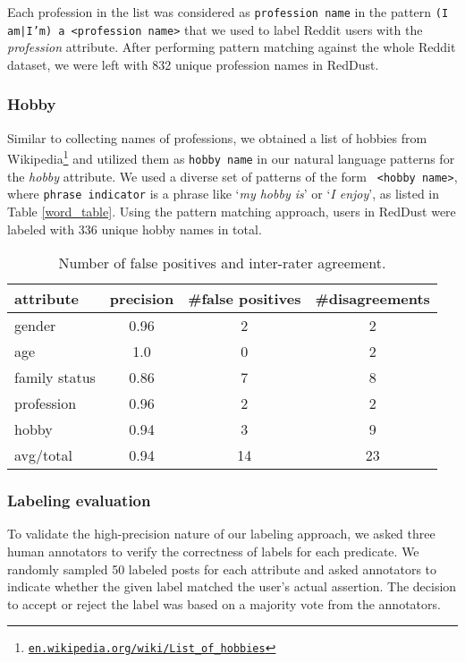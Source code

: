 Each profession in the list was considered as \texttt{\small profession name} in the pattern \texttt{\small (I am|I'm) a <profession name>} that we used to label Reddit users with the \emph{profession} attribute.
After performing pattern matching against the whole Reddit dataset, we were left with 832 unique profession names in RedDust.

\subsubsection{Hobby}
Similar to collecting names of professions, we obtained a list of hobbies from Wikipedia\footnote{ \href{https://en.wikipedia.org/wiki/List_of_hobbies}{\texttt{en.wikipedia.org/wiki/List\_of\_hobbies}}} and 
utilized them as \texttt{\small hobby name} in our natural language patterns for the \emph{hobby} attribute.
We used a diverse set of patterns of the form \texttt{ <hobby name>}, where \texttt{\small phrase indicator} is a phrase like `\textit{my hobby is}' or `\textit{I enjoy}', as listed in Table \ref{word_table}. 
Using the pattern matching approach, users in RedDust were labeled with 336 unique hobby names in total.

\begin{table}[h!]\sffamily
\centering
\small
\begin{adjustbox}{width=0.6\textwidth}
\begin{tabular}{lccc}
\toprule
\textbf{attribute} & \textbf{precision} & \textbf{\#false positives} & \textbf{\#disagreements} \\
\midrule
gender & 0.96 & 2 & 2 \\
age & 1.0 & 0 & 2 \\
family status & 0.86 & 7 & 8 \\
profession & 0.96 & 2 & 2 \\
hobby & 0.94 & 3 & 9 \\
\midrule
avg/total & 0.94 & 14 & 23 \\
\bottomrule
\end{tabular}
\end{adjustbox}
\caption{Number of false positives and inter-rater agreement.}
\label{agreement}
\end{table}

\subsubsection{Labeling evaluation}
\label{kappa2}
To validate the high-precision nature of our labeling approach, we asked three human annotators 
to verify the correctness of labels for each predicate. We randomly sampled 50 labeled posts for each attribute and asked annotators to indicate whether the given label matched the user's actual assertion. The decision to accept or reject the label was based on a majority vote from the annotators.

